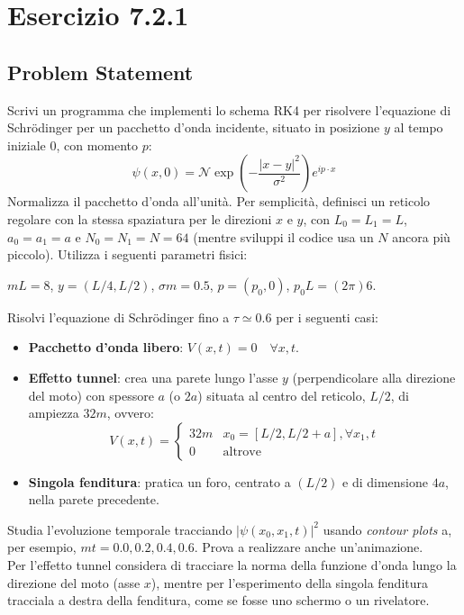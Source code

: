 \newpage














\section{Esercizio 7.2.1}



\subsection{Problem Statement}
Scrivi un programma che implementi lo schema RK4 per risolvere l'equazione di Schrödinger per un pacchetto d'onda incidente, situato in posizione $y$ al tempo iniziale $0$, con momento $p$:$$\psi(x,0) = \mathcal{N} \exp\left(-\frac{|x-y|^2}{\sigma^2}\right) e^{ip \cdot x}$$Normalizza il pacchetto d'onda all'unità.  Per semplicità, definisci un reticolo regolare con la stessa spaziatura per le direzioni $x$ e $y$, con $L_0 = L_1 = L$, $a_0 = a_1 = a$ e $N_0 = N_1 = N = 64$ (mentre sviluppi il codice usa un $N$ ancora più piccolo).  Utilizza i seguenti parametri fisici:
\begin{center}
    $mL = 8$, $y = (L/4, L/2)$, $\sigma m = 0.5$, $p = (p_0, 0)$, $p_0 L = (2\pi)6$.  
\end{center}

\noindent Risolvi l'equazione di Schrödinger fino a $\tau \simeq 0.6$ per i seguenti casi:  
\begin{itemize}
    \item \textbf{Pacchetto d'onda libero}: $V(x,t) = 0 \quad \forall x,t$.  
    
    \item \textbf{Effetto tunnel}: crea una parete lungo l'asse $y$ (perpendicolare alla direzione del moto) con spessore $a$ (o $2a$) situata al centro del reticolo, $L/2$, di ampiezza $32m$, ovvero:
    $$V(x,t) = \begin{cases} 32m & x_0 = [L/2, L/2+a], \forall x_1, t \\ 0 & \text{altrove} \end{cases}$$
    
    \item \textbf{Singola fenditura}: pratica un foro, centrato a $(L/2)$ e di dimensione $4a$, nella parete precedente.  
\end{itemize}
Studia l'evoluzione temporale tracciando $|\psi(x_0, x_1, t)|^2$ usando \textit{contour plots} a, per esempio, $mt = 0.0, 0.2, 0.4, 0.6$. Prova a realizzare anche un'animazione.\\
Per l'effetto tunnel considera di tracciare la norma della funzione d'onda lungo la direzione del moto (asse $x$), mentre per l'esperimento della singola fenditura tracciala a destra della fenditura, come se fosse uno schermo o un rivelatore.  

